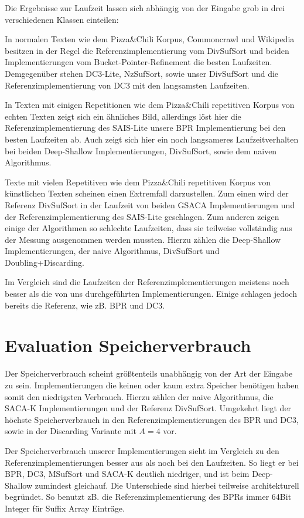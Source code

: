 Die Ergebnisse zur Laufzeit lassen sich abhängig von der Eingabe grob in drei verschiedenen Klassen einteilen:

In normalen Texten wie dem Pizza\&Chili Korpus, Commoncrawl und Wikipedia besitzen in der Regel die Referenzimplementierung vom DivSufSort und beiden Implementierungen vom Bucket-Pointer-Refinement die besten Laufzeiten. Demgegenüber stehen DC3-Lite, NzSufSort, sowie unser DivSufSort und die Referenzimplementierung von DC3 mit den langsamsten Laufzeiten.

In Texten mit einigen Repetitionen wie dem  Pizza\&Chili repetitiven Korpus von echten Texten zeigt sich ein ähnliches Bild, allerdings löst hier die Referenzimplementierung des SAIS-Lite unsere BPR Implementierung bei den besten Laufzeiten ab. Auch zeigt sich hier ein noch langsameres Laufzeitverhalten bei beiden Deep-Shallow Implementierungen, DivSufSort, sowie dem naiven Algorithmus.

Texte mit vielen Repetitiven wie dem Pizza\&Chili repetitiven Korpus von künstlichen Texten scheinen einen Extremfall darzustellen. Zum einen wird der Referenz DivSufSort in der Laufzeit von beiden GSACA Implementierungen und der Referenzimplementierung des SAIS-Lite geschlagen. Zum anderen zeigen einige der Algorithmen so schlechte Laufzeiten, dass sie teilweise vollständig aus der Messung ausgenommen werden mussten. Hierzu zählen die Deep-Shallow Implementierungen, der naive Algorithmus, DivSufSort und Doubling+Discarding.

Im Vergleich sind die Laufzeiten der Referenzimplementierungen meistens noch besser als die von uns durchgeführten Implementierungen. Einige schlagen jedoch bereits die Referenz, wie zB. BPR und DC3.

\section{Evaluation Speicherverbrauch}

Der Speicherverbrauch scheint größtenteils unabhängig von der Art der Eingabe zu sein. Implementierungen die keinen oder kaum extra Speicher benötigen haben somit den niedrigsten Verbrauch. Hierzu zählen der naive Algorithmus, die SACA-K Implementierungen und der Referenz DivSufSort. Umgekehrt liegt der höchste Speicherverbrauch in den Referenzimplementierungen des BPR und DC3, sowie in der Discarding Variante mit $A=4$ vor.

Der Speicherverbrauch unserer Implementierungen sieht im Vergleich zu den Referenzimplementierungen besser aus als noch bei den Laufzeiten. So liegt er bei BPR, DC3, MSufSort und SACA-K deutlich niedriger, und ist beim Deep-Shallow zumindest gleichauf. Die Unterschiede sind hierbei teilweise architekturell begründet. So benutzt zB. die Referenzimplementierung des BPRs immer 64Bit Integer für Suffix Array Einträge.

\newpage

